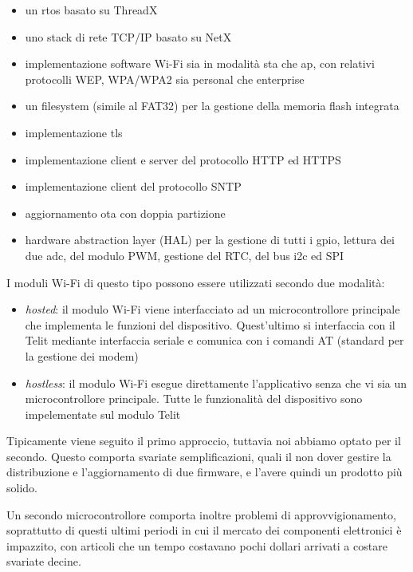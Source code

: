 \documentclass[12pt,a4paper,twoside,titlepage]{book}
\begin{document}
\begin{itemize}
    \item un \Gls{rtos} basato su ThreadX
    \item uno stack di rete TCP/IP basato su NetX
    \item implementazione software Wi-Fi sia in modalità \acrfull{sta} che \acrfull{ap},
        con relativi protocolli WEP, WPA/WPA2 sia personal che enterprise
    \item un filesystem (simile al FAT32) per la gestione della memoria flash integrata
    \item implementazione \gls{tls}
    \item implementazione client e server del protocollo HTTP ed HTTPS
    \item implementazione client del protocollo SNTP
    \item aggiornamento \acrshort{ota} con doppia partizione
    \item hardware abstraction layer (HAL) per la gestione di tutti i \Gls{gpio},
        lettura dei due \Gls{adc}, del modulo PWM, gestione del RTC, del bus i2c ed SPI
\end{itemize}

I moduli Wi-Fi di questo tipo possono essere utilizzati secondo due modalità:
\begin{itemize}
    \item \textit{hosted}: il modulo Wi-Fi viene interfacciato ad un microcontrollore
        principale che implementa le funzioni del dispositivo. Quest'ultimo si interfaccia
        con il Telit mediante interfaccia seriale e comunica con i comandi AT (standard
        per la gestione dei modem)
    \item \textit{hostless}: il modulo Wi-Fi esegue direttamente l'applicativo senza
        che vi sia un microcontrollore principale. Tutte le funzionalità del dispositivo
        sono impelementate sul modulo Telit
\end{itemize}

Tipicamente viene seguito il primo approccio, tuttavia noi abbiamo optato per il secondo.
Questo comporta svariate semplificazioni, quali il non dover gestire la distribuzione
e l'aggiornamento di due \gls{firmware}, e l'avere quindi un prodotto più solido.

Un secondo microcontrollore comporta inoltre problemi di approvvigionamento, soprattutto di
questi ultimi periodi in cui il mercato dei componenti elettronici è impazzito, con
articoli che un tempo costavano pochi dollari arrivati a costare svariate decine.
\end{document}

